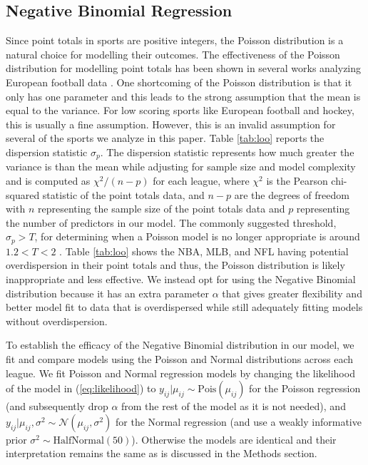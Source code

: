\subsection{Negative Binomial Regression}
Since point totals in sports are positive integers, the Poisson distribution is a natural choice for modelling their outcomes. The effectiveness of the Poisson distribution for modelling point totals has been shown in several works analyzing European football data \cite{Karlis2003} \cite{Baio2010} \cite{Benz2020}. One shortcoming of the Poisson distribution is that it only has one parameter and this leads to the strong assumption that the mean is equal to the variance. For low scoring sports like European football and hockey, this is usually a fine assumption. However, this is an invalid assumption for several of the sports we analyze in this paper. Table \ref{tab:loo} reports the dispersion statistic \(\sigma_p\). The dispersion statistic represents how much greater the variance is than the mean while adjusting for sample size and model complexity and is computed as  \(\chi^2/(n-p)\) for each league, where \(\chi^2\) is the Pearson chi-squared statistic of the point totals data, and \(n-p\) are the degrees of freedom with \(n\) representing the sample size of the point totals data and \(p\) representing the number of predictors in our model. The commonly suggested threshold, \(\sigma_p > T\), for determining when a Poisson model is no longer appropriate is around \(1.2 < T < 2\) \cite{Payne2018} \cite{Cameron1990}. Table \ref{tab:loo} shows the NBA, MLB, and NFL having potential overdispersion in their point totals and thus, the Poisson distribution is likely inappropriate and less effective. We instead opt for using the Negative Binomial distribution because it has an extra parameter \(\alpha\) that gives greater flexibility and better model fit to data that is overdispersed while still adequately fitting models without overdispersion.

To establish the efficacy of the Negative Binomial distribution in our model, we fit and compare models using the Poisson and Normal distributions across each league. We fit Poisson and Normal regression models by changing the likelihood of the model in (\ref{eq:likelihood}) to \(y_{ij} | \mu_{ij} \sim \text{Pois}(\mu_{ij})\) for the Poisson regression (and subsequently drop \(\alpha\) from the rest of the model as it is not needed), and \(y_{ij} | \mu_{ij}, \sigma^2 \sim \mathcal{N}(\mu_{ij}, \sigma^2)\) for the Normal regression (and use a weakly informative prior \(\sigma^2 \sim \text{HalfNormal}(50)\)). Otherwise the models are identical and their interpretation remains the same as is discussed in the Methods section.

